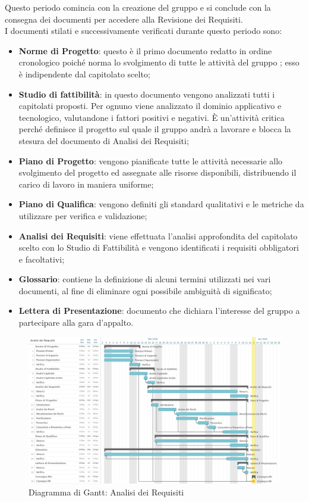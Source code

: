 Questo periodo comincia con la creazione del gruppo e si conclude con la consegna dei documenti per accedere alla Revisione dei Requisiti.\\
I documenti stilati e successivamente verificati durante questo periodo sono:
\begin{itemize}
\item \textbf{Norme di Progetto}: questo è il primo documento redatto in ordine cronologico poiché norma lo svolgimento di tutte le attività del gruppo \Gruppo; esso è indipendente dal capitolato scelto;
\item \textbf{Studio di fattibilità}: in questo documento vengono analizzati tutti i capitolati proposti. Per ognuno viene analizzato il dominio applicativo e tecnologico, valutandone i fattori positivi e negativi. È un’attività critica perché definisce il progetto sul quale il gruppo andrà a lavorare e blocca la stesura del documento di Analisi dei Requisiti;
\item \textbf{Piano di Progetto}: vengono pianificate tutte le attività necessarie allo svolgimento del progetto ed assegnate alle risorse disponibili, distribuendo il carico di lavoro in maniera uniforme;
\item \textbf{Piano di Qualifica}: vengono definiti gli standard qualitativi e le metriche da utilizzare per verifica e validazione;
\item \textbf{Analisi dei Requisiti}: viene effettuata l’analisi approfondita del capitolato scelto con lo Studio di Fattibilità e vengono identificati i requisiti obbligatori e facoltativi;
\item \textbf{Glossario}: contiene la definizione di alcuni termini utilizzati nei vari documenti, al fine di eliminare ogni possibile ambiguità di significato;
\item \textbf{Lettera di Presentazione}: documento che dichiara l’interesse del gruppo a partecipare alla gara d’appalto.
\end{itemize}

\begin{figure}
	\centerline{\includegraphics[scale=0.4]{img/DiagrammiGantt/AnalisiRequisiti.jpg}}
	\caption{Diagramma di Gantt: Analisi dei Requisiti}
\end{figure}
\clearpage

